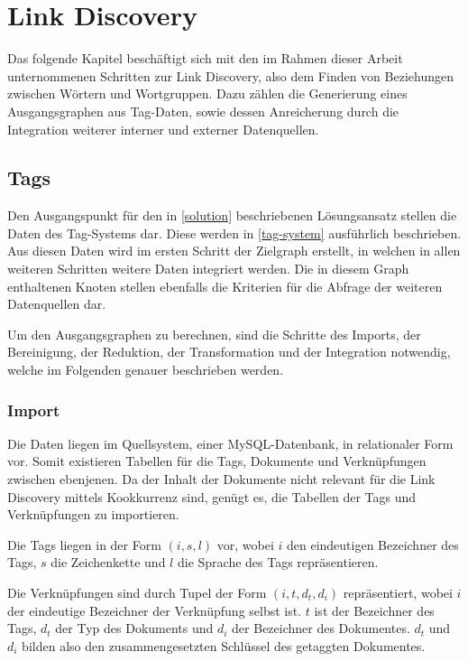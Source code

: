 \chapter{Link Discovery}
\label{link_discovery}

Das folgende Kapitel beschäftigt sich mit den im Rahmen dieser Arbeit unternommenen Schritten zur Link Discovery, also dem Finden von Beziehungen zwischen Wörtern und Wortgruppen. Dazu zählen die Generierung eines Ausgangsgraphen aus Tag-Daten, sowie dessen Anreicherung durch die Integration weiterer interner und externer Datenquellen.

\section{Tags}

Den Ausgangspunkt für den in \ref{solution} beschriebenen Lösungsansatz stellen die Daten des Tag-Systems dar. Diese werden in \ref{tag-system} ausführlich beschrieben. Aus diesen Daten wird im ersten Schritt der Zielgraph erstellt, in welchen in allen weiteren Schritten weitere Daten integriert werden. Die in diesem Graph enthaltenen Knoten stellen ebenfalls die Kriterien für die Abfrage der weiteren Datenquellen dar.

Um den Ausgangsgraphen zu berechnen, sind die Schritte des Imports, der Bereinigung, der Reduktion, der Transformation und der Integration notwendig, welche im Folgenden genauer beschrieben werden.

\subsection{Import}

Die Daten liegen im Quellsystem, einer MySQL-Datenbank, in relationaler Form vor. Somit existieren Tabellen für die Tags, Dokumente und Verknüpfungen zwischen ebenjenen. Da der Inhalt der Dokumente nicht relevant für die Link Discovery mittels Kookkurrenz sind, genügt es, die Tabellen der Tags und Verknüpfungen zu importieren.

Die Tags liegen in der Form \((i, s, l)\) vor, wobei \(i\) den eindeutigen Bezeichner des Tags, \(s\) die Zeichenkette und \(l\) die Sprache des Tags repräsentieren.

Die Verknüpfungen sind durch Tupel der Form \((i, t, d_t, d_i)\) repräsentiert, wobei \(i\) der eindeutige Bezeichner der Verknüpfung selbst ist. \(t\) ist der Bezeichner des Tags, \(d_t\) der Typ des Dokuments und \(d_i\) der Bezeichner des Dokumentes. \(d_t\) und \(d_i\) bilden also den zusammengesetzten Schlüssel des getaggten Dokumentes. 
 
